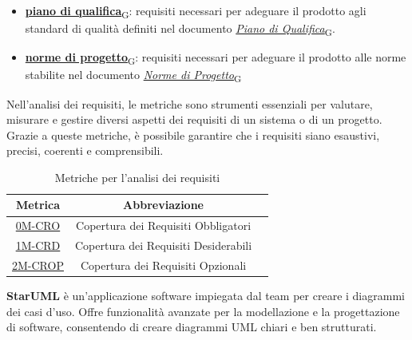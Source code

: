 \begin{enumerate}
\begin{itemize}
		      \item \href{https://7last.github.io/docs/rtb/documentazione-interna/glossario\#piano-di-qualifica}{\textbf{piano di qualifica}\textsubscript{G}}: requisiti necessari per adeguare il prodotto agli standard di qualità definiti nel documento \href{https://7last.github.io/docs/rtb/documentazione-interna/glossario\#piano-di-qualifica}{\textit{Piano di Qualifica}\textsubscript{G}}.
		      \item \href{https://7last.github.io/docs/rtb/documentazione-interna/glossario\#norme-di-progetto}{\textbf{norme di progetto}\textsubscript{G}}: requisiti necessari per adeguare il prodotto alle norme stabilite nel documento \href{https://7last.github.io/docs/rtb/documentazione-interna/glossario\#norme-di-progetto}{\textit{Norme di Progetto}\textsubscript{G}}
	      \end{itemize}
\end{enumerate}


Nell'analisi dei requisiti, le metriche sono strumenti essenziali per valutare, misurare e gestire diversi aspetti dei requisiti di un sistema o di un progetto. Grazie a queste metriche, è possibile garantire che i requisiti siano esaustivi, precisi, coerenti e comprensibili.\\
\begin{table}[!h] %
	\centering
	\begin{tabular}{|c|c|c|}
		\hline
		\textbf{Metrica}                    & \textbf{Abbreviazione}\\
		\hline
		\hyperlink{subsection.6.2}{0M-CRO}  & Copertura dei Requisiti Obbligatori  \\
		\hyperlink{subsection.6.2}{1M-CRD}  & Copertura dei Requisiti Desiderabili \\
		\hyperlink{subsection.6.2}{2M-CROP} & Copertura dei Requisiti Opzionali    \\
		\hline
	\end{tabular}
	\caption{Metriche per l'analisi dei requisiti}
	\label{tab:1}
\end{table}

\textbf{StarUML} è un'applicazione software impiegata dal team per creare i diagrammi dei casi d'uso. Offre funzionalità avanzate per la modellazione e la progettazione di software, consentendo di creare diagrammi UML chiari e ben strutturati.\\

